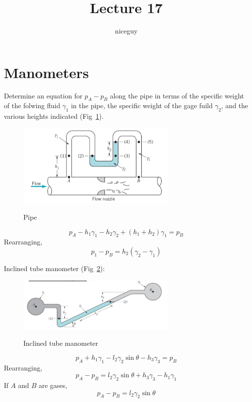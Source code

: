\documentclass[12pt]{article}
\author{niceguy}
\title{Lecture 17}
\begin{document}
\maketitle

\section{Manometers}

\begin{ex}
	Determine an equation for $p_A-p_B$ along the pipe in terms of the specific weight of the folwing fluid $\gamma_1$ in the pipe, the specific weight of the gage fuild $\gamma_2$, and the various heights indicated (Fig~\ref{m1}).

	\begin{figure}
		\centering
		\includegraphics[width=0.7\textwidth]{m1.png}
		\label{m1}
		\caption{Pipe}
	\end{figure}
	$$p_A - h_1\gamma_1 - h_2\gamma_2 + (h_1+h_2)\gamma_1 = p_B$$
	Rearranging,
	$$p_1-p_B = h_2(\gamma_2-\gamma_1)$$
\end{ex}

\begin{ex}
	Inclined tube manometer (Fig~\ref{m2}):

	\begin{figure}
		\centering
		\includegraphics[width=0.7\textwidth]{m2.png}
		\label{m2}
		\caption{Inclined tube manometer}
	\end{figure}

	$$p_A + h_1\gamma_1 - l_2\gamma_2\sin\theta - h_3\gamma_3 = p_B$$
	Rearranging,
	$$p_A - p_B = l_2\gamma_2\sin\theta + h_3\gamma_3 - h_1\gamma_1$$
	If $A$ and $B$ are gases,
	$$p_A - p_B = l_2\gamma_2\sin\theta$$
\end{ex}
\end{document}
